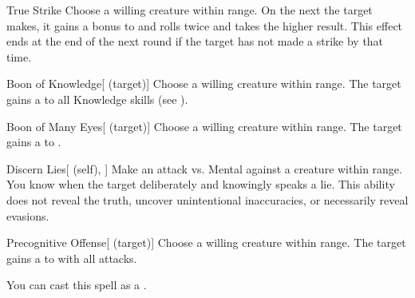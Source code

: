 \lowercase{\hypertarget{spell:True Strike}{}}\label{spell:True Strike}
\begin{apability}[\nth{1}]{\hypertarget{spell:True Strike}{True Strike}}
Choose a willing creature within \rngclose range.
On the next  the target makes, it gains a  bonus to  and rolls twice and takes the higher result.
This effect ends at the end of the next round if the target has not made a strike by that time.
\end{apability}
\vspace{0.25em}



\lowercase{\hypertarget{spell:Boon of Knowledge}{}}\label{spell:Boon of Knowledge}
\begin{attuneability}[\nth{2}]{\hypertarget{spell:Boon of Knowledge}{Boon of Knowledge}}[ (target)]
Choose a willing creature within \rngclose range.
The target gains a   to all Knowledge skills (see ).
\end{attuneability}
\vspace{0.25em}



\lowercase{\hypertarget{spell:Boon of Many Eyes}{}}\label{spell:Boon of Many Eyes}
\begin{attuneability}[\nth{2}]{\hypertarget{spell:Boon of Many Eyes}{Boon of Many Eyes}}[ (target)]
Choose a willing creature within \rngclose range.
The target gains a   to .
\end{attuneability}
\vspace{0.25em}



\lowercase{\hypertarget{spell:Discern Lies}{}}\label{spell:Discern Lies}
\begin{attuneability}[\nth{2}]{\hypertarget{spell:Discern Lies}{Discern Lies}}[ (self), ]
Make an attack vs. Mental against a creature within \rngmed range.
\hit You know when the target deliberately and knowingly speaks a lie.
This ability does not reveal the truth, uncover unintentional inaccuracies, or necessarily reveal evasions.
\end{attuneability}
\vspace{0.25em}



\lowercase{\hypertarget{spell:Precognitive Offense}{}}\label{spell:Precognitive Offense}
\begin{attuneability}[\nth{2}]{\hypertarget{spell:Precognitive Offense}{Precognitive Offense}}[ (target)]
Choose a willing creature within \rngclose range.
The target gains a   to  with all attacks.

You can cast this spell as a .
\end{attuneability}
\vspace{0.25em}



